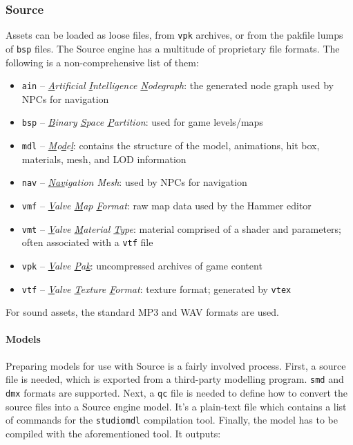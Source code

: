 \documentclass[a4paper, 12pt]{scrartcl}
\begin{document}
\subsubsection{Source}
Assets can be loaded as loose files, from \texttt{vpk} archives, or from the pakfile lumps of \texttt{bsp} files. The Source engine has a multitude of proprietary file formats. The following is a non-comprehensive list of them:

\begin{itemize}
  \item \texttt{ain} -- \textit{\underline{A}rtificial \underline{I}ntelligence \underline{N}odegraph}: the generated node graph used by NPCs for navigation
  \item \texttt{bsp} -- \textit{\underline{B}inary \underline{S}pace \underline{P}artition}: used for game levels/maps
  \item \texttt{mdl} -- \textit{\underline{M}o\underline{d}e\underline{l}}: contains the structure of the model, animations, hit box, materials, mesh, and LOD information
  \item \texttt{nav} -- \textit{\underline{Nav}igation Mesh}: used by NPCs for navigation
  \item \texttt{vmf} -- \textit{\underline{V}alve \underline{M}ap \underline{F}ormat}: raw map data used by the Hammer editor
  \item \texttt{vmt} -- \textit{\underline{V}alve \underline{M}aterial \underline{T}ype}: material comprised of a shader and parameters; often associated with a \texttt{vtf} file
  \item \texttt{vpk} -- \textit{\underline{V}alve \underline{P}a\underline{k}}: uncompressed archives of game content
  \item \texttt{vtf} -- \textit{\underline{V}alve \underline{T}exture \underline{F}ormat}: texture format; generated by \texttt{vtex}
\end{itemize}

For sound assets, the standard MP3 and WAV formats are used.

\paragraph{Models}
Preparing models for use with Source is a fairly involved process. First, a source file is needed, which is exported from a third-party modelling program. \texttt{smd} and \texttt{dmx} formats are supported. Next, a \texttt{qc} file is needed to define how to convert the source files into a Source engine model. It's a plain-text file which contains a list of commands for the \texttt{studiomdl} compilation tool. Finally, the model has to be compiled with the aforementioned tool. It outputs:
\end{document}

